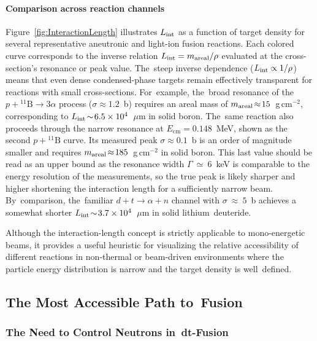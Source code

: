 \documentclass[particles,article,accept,pdftex,moreauthors]{Definitions/mdpi}
\begin{document}
\vspace{-6pt}\paragraph*{\bf Comparison across reaction channels}
Figure~\ref{fig:InteractionLength} illustrates $L_{\rm int}$ as a function of target density for several representative aneutronic and light-ion fusion reactions. Each colored curve corresponds to the inverse relation $L_{\rm int} = m_{\rm areal}/\rho$ evaluated at the cross-section's resonance or peak value. The~steep inverse dependence ($L_{\rm int}\propto 1/\rho$) means that even dense condensed-phase targets remain effectively transparent for reactions with small cross-sections. For~example, the~broad resonance of the $p+{}^{11}\mathrm{B}\!\to\!3\alpha$ process ($\sigma\!\approx\!1.2$~b) requires an areal mass of $m_{\rm areal}\!\approx\!15$~g\,cm${}^{-2}$, corresponding to $L_{\rm int}\!\sim\!6.5\times10^{4}$~$\mu$m in solid boron. The~same reaction also proceeds through the narrow resonance at $E_\mathrm{cm}=0.148$~MeV, shown as the second $p+{}^{11}\mathrm{B}$ curve. Its measured peak $\sigma\!\approx\!0.1$~b is an order of magnitude smaller and requires $m_{\rm areal}\!\approx\!185$~g\,cm${}^{-2}$ in solid boron. This last value should be read as an upper bound as the resonance width $\Gamma\!~\simeq\!~6$~keV is comparable to the energy resolution of the measurements, so the true peak is likely sharper and higher shortening the interaction length for a sufficiently narrow beam. By~comparison, the~familiar $d+t\!\to\!\alpha+n$ channel with $\sigma\!~\approx\!~5$~b achieves a somewhat shorter $L_{\rm int}\!\sim\!3.7\times10^{4}$~$\mu$m in solid lithium~deuteride.





Although the interaction-length concept is strictly applicable to mono-energetic beams, it provides a useful heuristic for visualizing the relative accessibility of different reactions in non-thermal or beam-driven environments where the particle energy distribution is narrow and the target density is well~defined.

\subsection{The Most Accessible Path to~Fusion}\label{ssec:eazyfusion}
\subsubsection{The Need to Control Neutrons in~dt-Fusion}\label{sssec:ICFneutrons}
\end{document}
